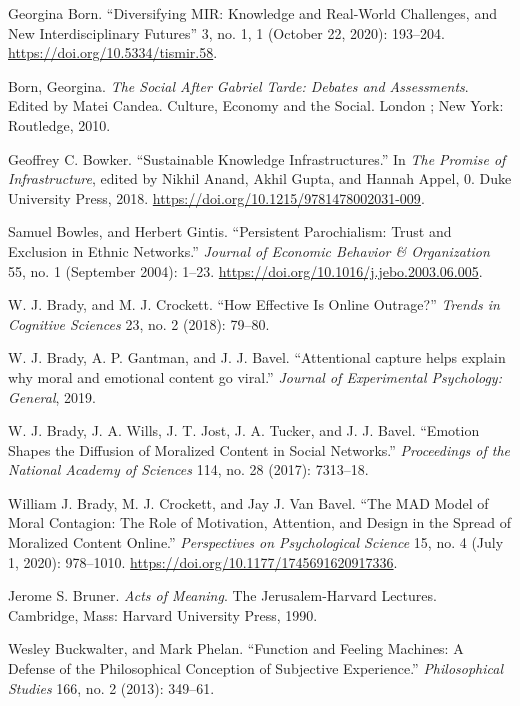 \documentclass[phdthesis,12pt,final,a4paper]{wuthesis}
\newlength{\cslhangindent}
\newenvironment{CSLReferences}[2] %
{\begin{list}{}{%
	\setlength{\itemindent}{0pt}
	\setlength{\leftmargin}{0pt}
	\setlength{\parsep}{0pt}
	\ifodd #1
	\setlength{\leftmargin}{\cslhangindent}
	\setlength{\itemindent}{-1\cslhangindent}
	\fi
	\setlength{\itemsep}{#2\baselineskip}}}
{\end{list}}
\theoremstyle{definition}
\theoremstyle{definition}
\theoremstyle{definition}
\theoremstyle{definition}
\theoremstyle{remark}
\begin{document}
\begin{CSLReferences}{1}{0}
Georgina Born. {``Diversifying {MIR}: {Knowledge} and {Real-World Challenges}, and {New Interdisciplinary Futures}''} 3, no. 1, 1 (October 22, 2020): 193--204. \url{https://doi.org/10.5334/tismir.58}.

Born, Georgina. \emph{The Social After {Gabriel Tarde}: Debates and Assessments}. Edited by Matei Candea. Culture, Economy and the Social. London ; New York: Routledge, 2010.

Geoffrey C. Bowker. {``Sustainable {Knowledge Infrastructures}.''} In \emph{The {Promise} of {Infrastructure}}, edited by Nikhil Anand, Akhil Gupta, and Hannah Appel, 0. Duke University Press, 2018. \url{https://doi.org/10.1215/9781478002031-009}.

Samuel Bowles, and Herbert Gintis. {``Persistent {Parochialism}: {Trust} and Exclusion in Ethnic Networks.''} \emph{Journal of Economic Behavior \& Organization} 55, no. 1 (September 2004): 1--23. \url{https://doi.org/10.1016/j.jebo.2003.06.005}.

W. J. Brady, and M. J. Crockett. {``How Effective Is Online Outrage?''} \emph{Trends in Cognitive Sciences} 23, no. 2 (2018): 79--80.

W. J. Brady, A. P. Gantman, and J. J. Bavel. {``Attentional capture helps explain why moral and emotional content go viral.''} \emph{Journal of Experimental Psychology: General}, 2019.

W. J. Brady, J. A. Wills, J. T. Jost, J. A. Tucker, and J. J. Bavel. {``Emotion Shapes the Diffusion of Moralized Content in Social Networks.''} \emph{Proceedings of the National Academy of Sciences} 114, no. 28 (2017): 7313--18.

William J. Brady, M. J. Crockett, and Jay J. Van Bavel. {``The {MAD} Model of Moral Contagion: The Role of Motivation, Attention, and Design in the Spread of Moralized Content Online.''} \emph{Perspectives on Psychological Science} 15, no. 4 (July 1, 2020): 978--1010. \url{https://doi.org/10.1177/1745691620917336}.

Jerome S. Bruner. \emph{Acts of Meaning}. The {Jerusalem-Harvard} Lectures. Cambridge, Mass: Harvard University Press, 1990.

Wesley Buckwalter, and Mark Phelan. {``Function and Feeling Machines: A Defense of the Philosophical Conception of Subjective Experience.''} \emph{Philosophical Studies} 166, no. 2 (2013): 349--61.


\end{CSLReferences}
\end{document}
